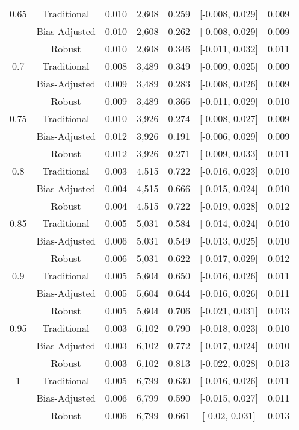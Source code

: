 \documentclass[
  12pt,
]{article}
\begin{document}
\begin{longtable}[t]{ccccccc}
0.65 & Traditional & 0.010 & 2,608 & 0.259 & {}[-0.008, 0.029] & 0.009\\
 & Bias-Adjusted & 0.010 & 2,608 & 0.262 & {}[-0.008, 0.029] & 0.009\\
 & Robust & 0.010 & 2,608 & 0.346 & {}[-0.011, 0.032] & 0.011\\
0.7 & Traditional & 0.008 & 3,489 & 0.349 & {}[-0.009, 0.025] & 0.009\\
 & Bias-Adjusted & 0.009 & 3,489 & 0.283 & {}[-0.008, 0.026] & 0.009\\
 & Robust & 0.009 & 3,489 & 0.366 & {}[-0.011, 0.029] & 0.010\\
0.75 & Traditional & 0.010 & 3,926 & 0.274 & {}[-0.008, 0.027] & 0.009\\
 & Bias-Adjusted & 0.012 & 3,926 & 0.191 & {}[-0.006, 0.029] & 0.009\\
 & Robust & 0.012 & 3,926 & 0.271 & {}[-0.009, 0.033] & 0.011\\
0.8 & Traditional & 0.003 & 4,515 & 0.722 & {}[-0.016, 0.023] & 0.010\\
 & Bias-Adjusted & 0.004 & 4,515 & 0.666 & {}[-0.015, 0.024] & 0.010\\
 & Robust & 0.004 & 4,515 & 0.722 & {}[-0.019, 0.028] & 0.012\\
0.85 & Traditional & 0.005 & 5,031 & 0.584 & {}[-0.014, 0.024] & 0.010\\
 & Bias-Adjusted & 0.006 & 5,031 & 0.549 & {}[-0.013, 0.025] & 0.010\\
 & Robust & 0.006 & 5,031 & 0.622 & {}[-0.017, 0.029] & 0.012\\
0.9 & Traditional & 0.005 & 5,604 & 0.650 & {}[-0.016, 0.026] & 0.011\\
 & Bias-Adjusted & 0.005 & 5,604 & 0.644 & {}[-0.016, 0.026] & 0.011\\
 & Robust & 0.005 & 5,604 & 0.706 & {}[-0.021, 0.031] & 0.013\\
0.95 & Traditional & 0.003 & 6,102 & 0.790 & {}[-0.018, 0.023] & 0.010\\
 & Bias-Adjusted & 0.003 & 6,102 & 0.772 & {}[-0.017, 0.024] & 0.010\\
 & Robust & 0.003 & 6,102 & 0.813 & {}[-0.022, 0.028] & 0.013\\
1 & Traditional & 0.005 & 6,799 & 0.630 & {}[-0.016, 0.026] & 0.011\\
 & Bias-Adjusted & 0.006 & 6,799 & 0.590 & {}[-0.015, 0.027] & 0.011\\
 & Robust & 0.006 & 6,799 & 0.661 & {}[-0.02, 0.031] & 0.013\\*
\end{longtable}
\endgroup{}
\end{document}
